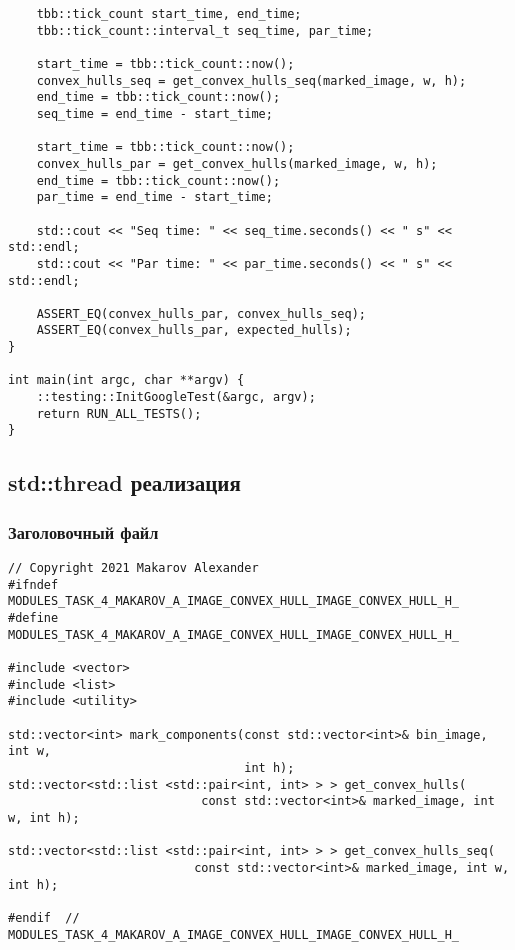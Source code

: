 \documentclass{report}
\begin{document}
\begin{lstlisting}
    tbb::tick_count start_time, end_time;
    tbb::tick_count::interval_t seq_time, par_time;

    start_time = tbb::tick_count::now();
    convex_hulls_seq = get_convex_hulls_seq(marked_image, w, h);
    end_time = tbb::tick_count::now();
    seq_time = end_time - start_time;

    start_time = tbb::tick_count::now();
    convex_hulls_par = get_convex_hulls(marked_image, w, h);
    end_time = tbb::tick_count::now();
    par_time = end_time - start_time;

    std::cout << "Seq time: " << seq_time.seconds() << " s" << std::endl;
    std::cout << "Par time: " << par_time.seconds() << " s" << std::endl;

    ASSERT_EQ(convex_hulls_par, convex_hulls_seq);
    ASSERT_EQ(convex_hulls_par, expected_hulls);
}

int main(int argc, char **argv) {
    ::testing::InitGoogleTest(&argc, argv);
    return RUN_ALL_TESTS();
}
\end{lstlisting}
\subsection*{std::thread реализация}
\subsubsection*{Заголовочный файл}
\begin{lstlisting}
// Copyright 2021 Makarov Alexander
#ifndef MODULES_TASK_4_MAKAROV_A_IMAGE_CONVEX_HULL_IMAGE_CONVEX_HULL_H_
#define MODULES_TASK_4_MAKAROV_A_IMAGE_CONVEX_HULL_IMAGE_CONVEX_HULL_H_

#include <vector>
#include <list>
#include <utility>

std::vector<int> mark_components(const std::vector<int>& bin_image, int w,
                                 int h);
std::vector<std::list <std::pair<int, int> > > get_convex_hulls(
                           const std::vector<int>& marked_image, int w, int h);

std::vector<std::list <std::pair<int, int> > > get_convex_hulls_seq(
                          const std::vector<int>& marked_image, int w, int h);

#endif  // MODULES_TASK_4_MAKAROV_A_IMAGE_CONVEX_HULL_IMAGE_CONVEX_HULL_H_
\end{lstlisting}
\end{document}

